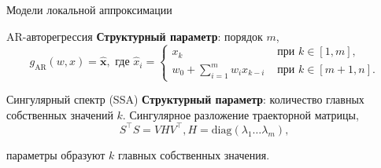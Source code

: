 \documentclass{beamer}
\newcommand{\bx}{\mathbf{x}}
\newcommand{\R}{\mathbb{R}}
\begin{document}
\begin{frame}{Модели локальной аппроксимации}
    \begin{block}{AR-авторегрессия}
        \textbf{Структурный параметр}: порядок $m$,
        $$
        g_{\text{AR}}(w, x) = \hat{\bx}, \text{ где }
        \hat{x}_i = \begin{cases}
            x_k & \text{ при } k \in [1, m], \\
            w_0 + \sum_{i=1}^m w_i x_{k - i} & \text{ при } k \in [m + 1, n].
        \end{cases}
        $$
    \end{block}


\begin{block}{Сингулярный спектр (SSA)}
    \textbf{Структурный параметр}: количество главных собственных значений $k$.
    Сингулярное разложение траекторной матрицы,
    $$
    S^\intercal S = VHV^\intercal, H = \mathrm{diag}(\lambda_1 \ldots \lambda_m),
    $$

    параметры образуют $k$ главных собственных значения.
\end{block}
\end{frame}

\end{document}
